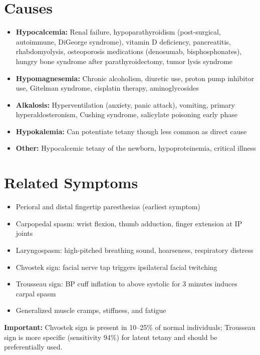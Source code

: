 \section*{Causes}
\begin{itemize}
  \item \textbf{Hypocalcemia:} Renal failure, hypoparathyroidism (post-surgical, autoimmune, DiGeorge syndrome), vitamin D deficiency, pancreatitis, rhabdomyolysis, osteoporosis medications (denosumab, bisphosphonates), hungry bone syndrome after parathyroidectomy, tumor lysis syndrome
  \item \textbf{Hypomagnesemia:} Chronic alcoholism, diuretic use, proton pump inhibitor use, Gitelman syndrome, cisplatin therapy, aminoglycosides
  \item \textbf{Alkalosis:} Hyperventilation (anxiety, panic attack), vomiting, primary hyperaldosteronism, Cushing syndrome, salicylate poisoning early phase
  \item \textbf{Hypokalemia:} Can potentiate tetany though less common as direct cause
  \item \textbf{Other:} Hypocalcemic tetany of the newborn, hypoproteinemia, critical illness
\end{itemize}

\section*{Related Symptoms}
\begin{itemize}
  \item Perioral and distal fingertip paresthesias (earliest symptom)
  \item Carpopedal spasm: wrist flexion, thumb adduction, finger extension at IP joints
  \item Laryngospasm: high-pitched breathing sound, hoarseness, respiratory distress
  \item Chvostek sign: facial nerve tap triggers ipsilateral facial twitching
  \item Trousseau sign: BP cuff inflation to above systolic for 3 minutes induces carpal spasm
  \item Generalized muscle cramps, stiffness, and fatigue
\end{itemize}
\textbf{Important:} Chvostek sign is present in 10--25\% of normal individuals; Trousseau sign is more specific (sensitivity 94\%) for latent tetany and should be preferentially used.

